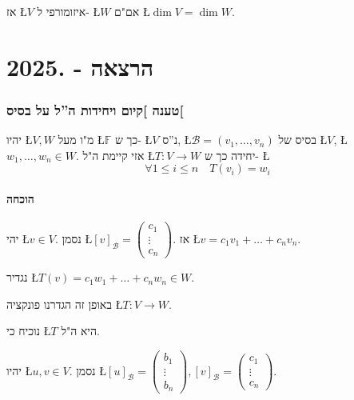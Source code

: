 \documentclass[english,hebrew]{article}
\begin{document}
אז \L{$V$} איזומורפי ל- \L{$W$} אם"ם \L{$\dim V=\dim W$}. 

\newpage{}

\noindent{}

\part{הרצאה {\endL} - {.2025\endL}}

\section{טענה {]}קיום ויחידות ה\textquotedblright ל על בסיס{[}}

יהיו \L{$V,W$} מ"ו מעל \L{$\mathbb{F}$} כך ש- \L{$V$} נ\textquotedblright ס,
\L{$\mathcal{B}=(v_{1},\dots,v_{n})$} בסיס של \L{$V$}, \L{$w_{1},\dots,w_{n}\in W$}.
אזי קיימת ה"ל \L{$T:V\to W$} יחידה כך ש- \L{%
\[
\forall1\le i\le n\quad T(v_{i})=w_{i}
\]
}%

\subsection{הוכחה}

יהי \L{$v\in V$}. נסמן \L{$[v]_{\mathcal{B}}=\begin{pmatrix}c_{1}\\
\vdots\\
c_{n}
\end{pmatrix}$}. אז \L{$v=c_{1}v_{1}+\dots+c_{n}v_{n}$}. 

נגדיר \L{$T(v)=c_{1}w_{1}+\dots+c_{n}w_{n}\in W$}.

באופן זה הגדרנו פונקציה \L{$T:V\to W$}.

נוכיח כי \L{$T$} היא ה"ל.

יהיו \L{$u,v\in V$}. נסמן \L{$[u]_{\mathcal{B}}=\begin{pmatrix}b_{1}\\
\vdots\\
b_{n}
\end{pmatrix},[v]_{\mathcal{B}}=\begin{pmatrix}c_{1}\\
\vdots\\
c_{n}
\end{pmatrix}$}. 
\end{document}
